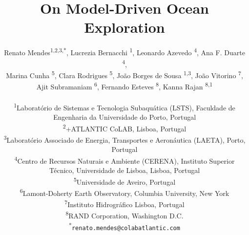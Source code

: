 \documentclass[11pt]{article}
\title{On Model-Driven Ocean Exploration}
\author{
Renato Mendes\textsuperscript{1,2,3,*},
Lucrezia Bernacchi \textsuperscript{1},
Leonardo Azevedo \textsuperscript{4},
Ana F. Duarte \textsuperscript{4},\\
Marina Cunha \textsuperscript{5},
Clara Rodrigues \textsuperscript{5},
João Borges de Sousa \textsuperscript{1,3},
João Vitorino \textsuperscript{7},\\
Ajit Subramaniam \textsuperscript{6},
Fernando Esteves \textsuperscript{8},
Kanna Rajan \textsuperscript{8,1}
\\
\\
\textsuperscript{1}{\scriptsize Laboratório de Sistemas e Tecnologia Subaquática (LSTS), Faculdade de Engenharia da Universidade do Porto, Portugal}\\
\textsuperscript{2}{\scriptsize +ATLANTIC CoLAB, Lisboa, Portugal}\\
\textsuperscript{3}{\scriptsize Laboratório Associado de Energia, Transportes e Aeronáutica (LAETA), Porto, Portugal}\\
\textsuperscript{4}{\scriptsize Centro de Recursos Naturais e Ambiente (CERENA), Instituto Superior T\'{e}cnico, Universidade de Lisboa, Lisboa, Portugal}\\
\textsuperscript{5}{\scriptsize Universidade de Aveiro, Portugal}\\
\textsuperscript{6}{\scriptsize Lamont-Doherty Earth Observatory, Columbia University, New York}\\
\textsuperscript{7}{\scriptsize Instituto Hidrogr{\'a}fico Lisboa, Portugal}\\
\textsuperscript{8}{\scriptsize RAND Corporation, Washington D.C.}\\
\textsuperscript{*}\texttt{{\scriptsize renato.mendes@colabatlantic.com}}
}
\date{}
\begin{document}
\maketitle








\footnotesize{
  
}
\end{document}
